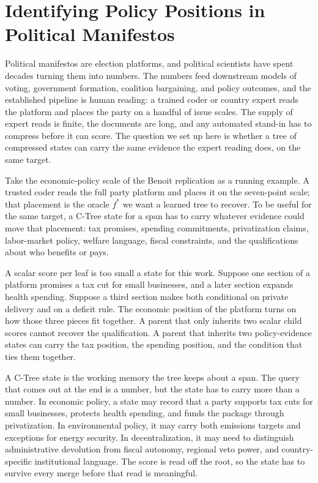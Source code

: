 \section{Identifying Policy Positions in Political Manifestos}
\label{sec:v8-manifesto-mechanism}

Political manifestos are election platforms, and political
scientists have spent decades turning them into numbers. The
numbers feed downstream models of voting, government formation,
coalition bargaining, and policy outcomes, and the established
pipeline is human reading: a trained coder or country expert reads
the platform and places the party on a handful of issue scales.
The supply of expert reads is finite, the documents are long, and
any automated stand-in has to compress before it can score. The
question we set up here is whether a tree of compressed states can
carry the same evidence the expert reading does, on the same
target.

Take the economic-policy scale of the Benoit replication as a
running example. A trusted coder reads the full party platform and places it
on the seven-point scale; that placement is the oracle \(f^\ast\)
we want a learned tree to recover. To be useful for the same
target, a C-Tree state for a span has to carry whatever evidence
could move that placement: tax promises, spending commitments,
privatization claims, labor-market policy, welfare language, fiscal
constraints, and the qualifications about who benefits or pays.

A scalar score per leaf is too small a state for this work. Suppose
one section of a platform promises a tax cut for small businesses,
and a later section expands health spending. Suppose a third section
makes both conditional on private delivery and on a deficit rule.
The economic position of the platform turns on how those three
pieces fit together. A parent that only inherits two scalar child
scores cannot recover the qualification. A parent that inherits two
policy-evidence states can carry the tax position, the spending
position, and the condition that ties them together.

A C-Tree state is the working memory the tree keeps about a span.
The query that comes out at the end is a number, but the state has
to carry more than a number. In economic policy, a state may record
that a party supports tax cuts for small businesses, protects health
spending, and funds the package through privatization. In
environmental policy, it may carry both emissions targets and
exceptions for energy security. In decentralization, it may need to
distinguish administrative devolution from fiscal autonomy, regional
veto power, and country-specific institutional language. The score
is read off the root, so the state has to survive every merge before
that read is meaningful.

